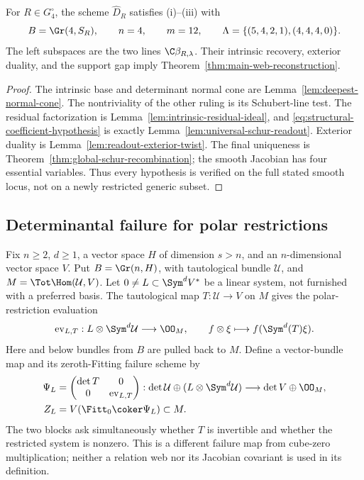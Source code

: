 \begin{corollary}
\label{cor:structural-web-instance}
For \(R\in G_4^\circ\), the scheme \(\widehat D_R\) satisfies
\textup{(i)--(iii)} with
\[
 B=\Gr(4,S_R),\qquad n=4,\qquad m=12,\qquad
 \Lambda=\{(5,4,2,1),(4,4,4,0)\}.
\]
The left subspaces are the two lines
\(\C\beta_{R,\lambda}\).  Their intrinsic recovery, exterior
duality, and the support gap imply Theorem~\ref{thm:main-web-reconstruction}.
\end{corollary}
\begin{proof}
The intrinsic base and determinant normal cone are
Lemma~\ref{lem:deepest-normal-cone}.  The nontriviality of the other
ruling is its Schubert-line test.  The residual factorization is
Lemma~\ref{lem:intrinsic-residual-ideal}, and
\eqref{eq:structural-coefficient-hypothesis} is exactly
Lemma~\ref{lem:universal-schur-readout}.  Exterior duality is
Lemma~\ref{lem:readout-exterior-twist}.  The final uniqueness is
Theorem~\ref{thm:global-schur-recombination}; the smooth Jacobian
has four essential variables.  Thus every hypothesis is verified on
the full stated smooth locus, not on a newly restricted generic subset.
\end{proof}

\subsection{Determinantal failure for polar restrictions}

Fix \(n\ge2\), \(d\ge1\), a vector space \(H\) of dimension
\(s>n\), and an \(n\)-dimensional vector space \(V\).  Put
\(B=\Gr(n,H)\), with tautological bundle \(\mathcal U\), and
\(M=\Tot\Hom(\mathcal U,V)\).  Let
\(0\ne L\subset\Sym^dV^*\) be a linear system, not furnished with
a preferred basis.  The tautological map \(T:\mathcal U\to V\)
on \(M\) gives the polar-restriction evaluation
\[
 \operatorname{ev}_{L,T}:L\otimes\Sym^d\mathcal U\longrightarrow\OO_M,
 \qquad f\otimes\xi\longmapsto f(\Sym^d(T)\xi).
\]
Here and below bundles from \(B\) are pulled back to \(M\).
Define a vector-bundle map and its zeroth-Fitting failure scheme by
\begin{align}
 \Psi_L&=\begin{pmatrix}\det T&0\\0&\operatorname{ev}_{L,T}\end{pmatrix}:
   \det\mathcal U\oplus(L\otimes\Sym^d\mathcal U)
          \longrightarrow\det V\oplus\OO_M,
             \label{eq:polar-fitting-map}\\
 Z_L&=V(\Fitt_0\coker\Psi_L)\subset M.
             \label{eq:polar-fitting-scheme}
\end{align}
The two blocks ask simultaneously whether \(T\) is invertible and
whether the restricted system is nonzero.  This is a different
failure map from cube-zero multiplication; neither a relation web nor
its Jacobian covariant is used in its definition.

